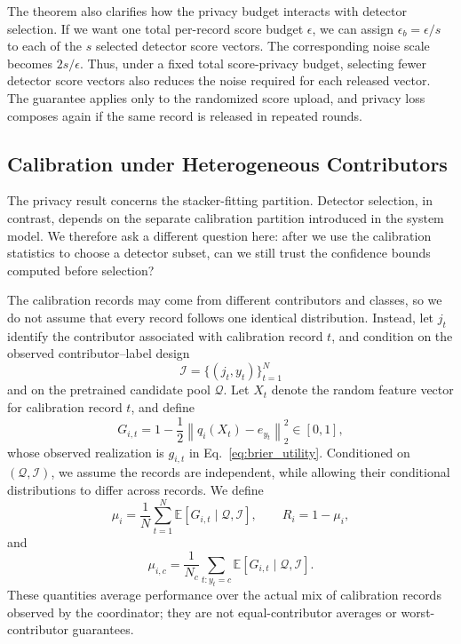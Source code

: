 \documentclass[conference]{IEEEtran}
\theoremstyle{definition}
\begin{document}
The theorem also clarifies how the privacy budget interacts with detector selection.
If we want one total per-record score budget $\epsilon$, we can assign $\epsilon_b=\epsilon/s$ to each of the $s$ selected detector score vectors.
The corresponding noise scale becomes $2s/\epsilon$.
Thus, under a fixed total score-privacy budget, selecting fewer detector score vectors also reduces the noise required for each released vector.
The guarantee applies only to the randomized score upload, and privacy loss composes again if the same record is released in repeated rounds.

\subsection{Calibration under Heterogeneous Contributors}

The privacy result concerns the stacker-fitting partition.
Detector selection, in contrast, depends on the separate calibration partition introduced in the system model.
We therefore ask a different question here: after we use the calibration statistics to choose a detector subset, can we still trust the confidence bounds computed before selection?

The calibration records may come from different contributors and classes, so we do not assume that every record follows one identical distribution.
Instead, let $j_t$ identify the contributor associated with calibration record $t$, and condition on the observed contributor--label design
\begin{equation}
\mathcal I=\{(j_t,y_t)\}_{t=1}^{N}
\end{equation}
and on the pretrained candidate pool $\mathcal Q$.
Let $X_t$ denote the random feature vector for calibration record $t$, and define
\begin{equation}
G_{i,t}=1-\frac12\left\|q_i(X_t)-e_{y_t}\right\|_2^2\in[0,1],
\end{equation}
whose observed realization is $g_{i,t}$ in Eq.~\ref{eq:brier_utility}.
Conditioned on $(\mathcal Q,\mathcal I)$, we assume the records are independent, while allowing their conditional distributions to differ across records.
We define
\begin{equation}
\mu_i=\frac1N\sum_{t=1}^{N}\mathbb E[G_{i,t}\mid\mathcal Q,\mathcal I],
\qquad
R_i=1-\mu_i,
\label{eq:heterogeneous_overall_mean}
\end{equation}
and
\begin{equation}
\mu_{i,c}=\frac1{N_c}\sum_{t:y_t=c}
\mathbb E[G_{i,t}\mid\mathcal Q,\mathcal I].
\label{eq:heterogeneous_class_mean}
\end{equation}
These quantities average performance over the actual mix of calibration records observed by the coordinator; they are not equal-contributor averages or worst-contributor guarantees.
\end{document}
